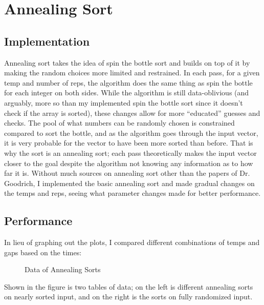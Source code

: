 \documentclass{article}
\begin{document}
\section{Annealing Sort}
\subsection{Implementation}
    Annealing sort takes the idea of spin the bottle sort and builds on top of
    it by making the random choices more limited and restrained. In each pass,
    for a given temp and number of reps, the algorithm does the same thing as
    spin the bottle for each integer on both sides. 
    \nextblurb 
    While the algorithm is still data-oblivious (and arguably, more so than my 
    implemented spin the bottle sort since it doesn't check if the array is 
    sorted), these changes allow for more ``educated'' guesses and checks. The 
    pool of what numbers can be randomly chosen is constrained compared to sort 
    the bottle, and as the algorithm goes through the input vector, it is very 
    probable for the vector to have been more sorted than before. That is why 
    the sort is an annealing sort; each pass theoretically makes the input 
    vector closer to the goal despite the algorithm not knowing any information 
    as to how far it is.
    \nextblurb
    Without much sources on annealing sort other than the papers of Dr.
    Goodrich, I implemented the basic annealing sort and made gradual changes
    on the temps and reps, seeing what parameter changes made for better
    performance.
\subsection{Performance}
    In lieu of graphing out the plots, I compared different combinations of
    temps and gaps based on the times:
    \begin{figure}[H]
        \centering
        \caption{Data of Annealing Sorts}
    \end{figure}
    \noindent Shown in the figure is two tables of data; on the left is 
    different annealing sorts on nearly sorted input, and on the right is the 
    sorts on fully randomized input. 
\end{document}
